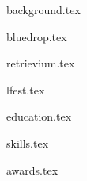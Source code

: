 \documentclass[11pt]{article}
\begin{document}
{background.tex}


{bluedrop.tex}

{retrievium.tex}

{lfest.tex}


{education.tex}


{skills.tex}


{awards.tex}
\end{document}
